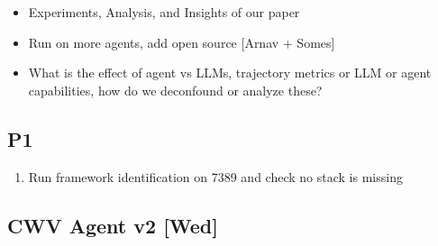 \begin{enumerate}
\begin{itemize}
    \begin{itemize}
        \item Visual Regression, show qunatitative and qualitative examples of Vis Regresisons [Ayush]
    \end{itemize}
    \item Experiments, Analysis, and Insights of our paper    
        \item Run on more agents, add open source [Arnav + Somes]
        \item What is the effect of agent vs LLMs, trajectory metrics or LLM or agent capabilities, how do we deconfound or analyze these?
    \end{itemize}
\end{enumerate}




\subsection{P1}
\begin{enumerate}
    \item Run framework identification on 7389 and check no stack is missing
\end{enumerate}

\subsection{CWV Agent v2 [Wed]}

